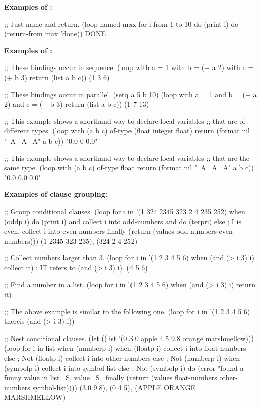  

{\bf Examples of :}

\code
;; Just name and return.
 (loop named max
       for i from 1 to 10
       do (print i)
       do (return-from max 'done))
\EV DONE
\endcode

{\bf Examples of :}

\code
;; These bindings occur in sequence.
 (loop with a = 1 
       with b = (+ a 2) 
       with c = (+ b 3)
       return (list a b c))
\EV (1 3 6)
 
;; These bindings occur in parallel.
 (setq a 5 b 10)
 (loop with a = 1
       and b = (+ a 2)
       and c = (+ b 3)
       return (list a b c))
\EV (1 7 13)
 
;; This example shows a shorthand way to declare local variables 
;; that are of different types.
 (loop with (a b c) of-type (float integer float)
       return (format nil "~A ~A ~A" a b c))
\EV "0.0 0 0.0"
 
;; This example shows a shorthand way to declare local variables 
;; that are the same type.
 (loop with (a b c) of-type float 
       return (format nil "~A ~A ~A" a b c))
\EV "0.0 0.0 0.0"
\endcode

{\bf Examples of clause grouping:}

\code
;; Group conditional clauses.
 (loop for i in '(1 324 2345 323 2 4 235 252)
       when (oddp i)
         do (print i)
         and collect i into odd-numbers
         and do (terpri)
       else                              ; I is even.
         collect i into even-numbers
       finally
         (return (values odd-numbers even-numbers)))
\OUT 
{} 
\OUT 
{} 
\OUT 
{} 
\EV (1 2345 323 235), (324 2 4 252)

;; Collect numbers larger than 3.
 (loop for i in '(1 2 3 4 5 6)
       when (and (> i 3) i)
       collect it)                      ; IT refers to (and (> i 3) i).
\EV (4 5 6)
 
;; Find a number in a list.
 (loop for i in '(1 2 3 4 5 6)
       when (and (> i 3) i)
       return it)
     
;; The above example is similar to the following one.
 (loop for i in '(1 2 3 4 5 6)
       thereis (and (> i 3) i))

\medbreak
;; Nest conditional clauses.
 (let ((list '(0 3.0 apple 4 5 9.8 orange marshmellow)))
   (loop for i in list
         when (numberp i)
           when (floatp i)
             collect i into float-numbers
           else                                  ; Not (floatp i)
             collect i into other-numbers
         else                                    ; Not (numberp i)
           when (symbolp i) 
             collect i into symbol-list
           else                                  ; Not (symbolp i)
             do (error "found a funny value in list ~S, value ~S~%
         finally (return (values float-numbers other-numbers symbol-list))))
\EV (3.0 9.8), (0 4 5), (APPLE ORANGE MARSHMELLOW)

